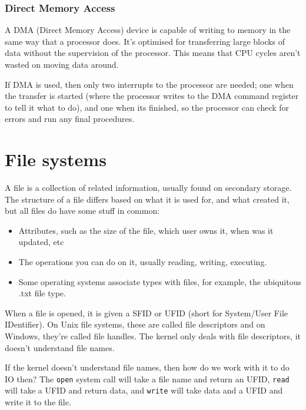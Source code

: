 \subsubsection{Direct Memory Access}

A DMA (Direct Memory Access) device is capable of writing to memory in the same
way that a processor does. It's optimised for transferring large blocks of data
without the supervision of the processor. This means that CPU cycles aren't
wasted on moving data around.

If DMA is used, then only two interrupts to the processor are needed; one when
the transfer is started (where the processor writes to the DMA command register
to tell it what to do), and one when its finished, so the processor can check
for errors and run any final procedures.

\section{File systems}

A file is a collection of related information, usually found on secondary
storage. The structure of a file differs based on what it is used for, and what
created it, but all files do have some stuff in common:

\begin{mymulticols}
  \begin{itemize}
    \item Attributes, such as the size of the file, which user owns it, when was
      it updated, etc
    \item The operations you can do on it, usually reading, writing, executing.
    \item Some operating systems associate types with files, for example, the
      ubiquitous .txt file type.
  \end{itemize}
\end{mymulticols}

When a file is opened, it is given a SFID or UFID (short for System/User File
IDentifier). On Unix file systems, these are called file descriptors
and on Windows, they're called file handles. The kernel only deals with file
descriptors, it doesn't understand file names.

If the kernel doesn't understand file names, then how do we work with it to do
IO then? The \texttt{open} system call will take a file name and return an UFID,
\texttt{read} will take a UFID and return data, and \texttt{write} will take
data and a UFID and write it to the file.

